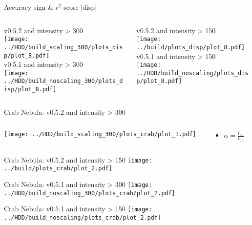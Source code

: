 \begin{frame}{Accuracy sign \& $r^2$-score |disp|}
    \begin{columns}[onlytextwidth]
        \begin{column}{0.49\textwidth}
            \centering
            \small v0.5.2 and intensity > 300\\
            \texttt{[image: ../HDD/build\_scaling\_300/plots\_disp/plot\_8.pdf]}\\
            \small v0.5.1 and intensity > 300\\
            \texttt{[image: ../HDD/build\_noscaling\_300/plots\_disp/plot\_8.pdf]} 
        \end{column}
        \begin{column}{0.49\textwidth}
            \centering
            \small v0.5.2 and intensity > 150\\
            \texttt{[image: ../build/plots\_disp/plot\_8.pdf]}\\
            \small v0.5.1 and intensity > 150\\
            \texttt{[image: ../HDD/build\_noscaling/plots\_disp/plot\_8.pdf]}  
        \end{column}
    \end{columns} 
\end{frame}

\begin{frame}{Crab Nebula: v0.5.2 and intensity > 300}
    \begin{columns}[onlytextwidth]
        \begin{column}{0.65\textwidth}
            \centering
            \texttt{[image: ../HDD/build\_scaling\_300/plots\_crab/plot\_1.pdf]}
        \end{column}
        \begin{column}{0.3\textwidth}
            \begin{itemize}
                \item $\alpha = \frac{t_\text{on}}{t_\text{off}}$
            \end{itemize}   
        \end{column}
    \end{columns}  
\end{frame}

\begin{frame}{Crab Nebula: v0.5.2 and intensity > 150}
    \centering
    \texttt{[image: ../build/plots\_crab/plot\_2.pdf]}
\end{frame}

\begin{frame}{Crab Nebula: v0.5.1 and intensity > 300}
    \centering
    \texttt{[image: ../HDD/build\_noscaling\_300/plots\_crab/plot\_2.pdf]}
\end{frame}

\begin{frame}{Crab Nebula: v0.5.1 and intensity > 150}
    \centering
    \texttt{[image: ../HDD/build\_noscaling/plots\_crab/plot\_2.pdf]}
\end{frame}